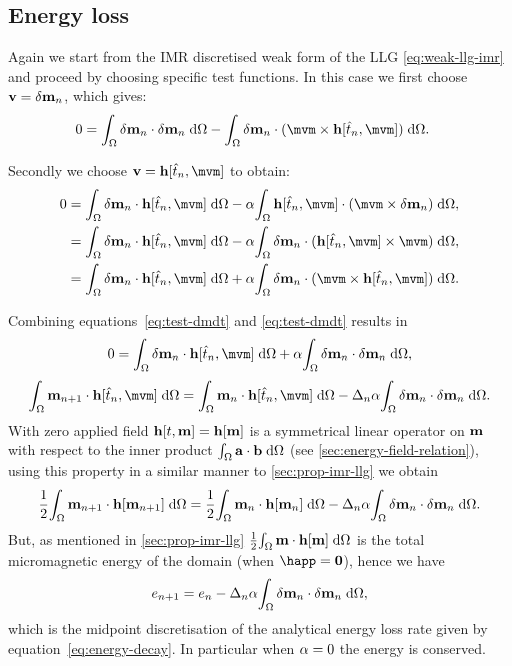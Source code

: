 \subsection{Energy loss}

Again we start from the IMR discretised weak form of the LLG \eqref{eq:weak-llg-imr} and proceed by choosing specific test functions.
In this case we first choose $\mathbf{v} = \delta \mathbf{m}_n$, which gives:
\begin{equation}
  \label{eq:test-dmdt}
  \begin{aligned}
    0 &= \intd{\dmdtm \cdot \dmdtm} - \intd{\dmdtm  \cdot (\mvm \times \hv[\tm, \mvm])}.
  \end{aligned}
\end{equation}

Secondly we choose $\testv = \hv[\tm, \mvm]$ to obtain:
\begin{equation}
  \label{eq:test-h}
  \begin{aligned}
    0 &= \intd{\dmdtm \cdot \hv[\tm, \mvm]} - \dampc \intd{\hv[\tm, \mvm] \cdot (\mvm \times \dmdtm)}, \\
    & = \intd{\dmdtm \cdot \hv[\tm, \mvm]} - \dampc \intd{\dmdtm \cdot (\hv[\tm, \mvm] \times \mvm)}, \\
    & = \intd{\dmdtm \cdot \hv[\tm, \mvm]} + \dampc \intd{\dmdtm \cdot (\mvm \times \hv[\tm, \mvm])}.
  \end{aligned}
\end{equation}

Combining equations~\eqref{eq:test-dmdt} and \eqref{eq:test-dmdt} results in
\begin{equation}
  0 = \intd{\dmdtm \cdot \hv[\tm, \mvm]} + \dampc \intd{\dmdtm \cdot \dmdtm},
\end{equation}
\ie
\begin{equation}
  \intd{\mv_{n+1} \cdot \hv[\tm, \mvm]} = \intd{\mv_n \cdot \hv[\tm, \mvm]} - \dtn \dampc \intd{\dmdtm \cdot \dmdtm}.
\end{equation}
With zero applied field $\mathbf{h}[t, \mathbf{m}] = \mathbf{h}[\mathbf{m}]$ is a symmetrical linear operator on $\mathbf{m}$ with respect to the inner product ${\int_{\Omega} {\mathbf{a}} \cdot {\mathbf{b}} {\; \text{d}} {\Omega}}$ (see \autoref{sec:energy-field-relation}), using this property in a similar manner to \autoref{sec:prop-imr-llg} we obtain
\begin{equation}
  \frac{1}{2}{\int_{\Omega} \mathbf{m}_{n+1} \cdot \mathbf{h}[\mathbf{m}_{n+1}] {\; \text{d}} {\Omega}} = \frac{1}{2}{\int_{\Omega} \mathbf{m}_n \cdot \mathbf{h}[\mathbf{m}_n] {\; \text{d}} {\Omega}} - \Delta_{n} \alpha {\int_{\Omega} \delta\mathbf{m}_n\cdot \delta\mathbf{m}_n{\; \text{d}}{\Omega}}.
\end{equation}
But, as mentioned in \autoref{sec:prop-imr-llg} $\frac{1}{2}{\int_{\Omega} \mathbf{m} \cdot \mathbf{h}[\mathbf{m}] {\; \text{d}} {\Omega}}$ is the total micromagnetic energy of the domain (when $\happ = \zerov$), hence we have
\begin{equation}
  e_{n+1} = e_n - \Delta_{n} \alpha {\int_{\Omega} \delta\mathbf{m}_n\cdot \delta\mathbf{m}_n{\; \text{d}}{\Omega}},
\end{equation}
which is the midpoint discretisation of the analytical energy loss rate given by equation~\eqref{eq:energy-decay}.
In particular when $\alpha = 0$ the energy is conserved.

